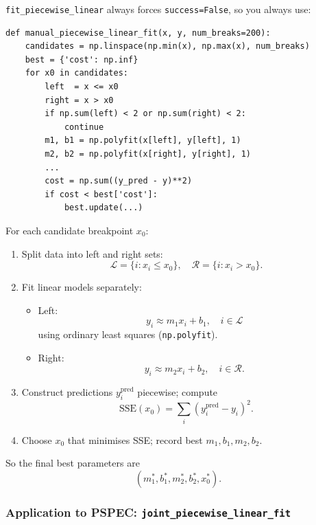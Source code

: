 \documentclass[11pt]{article}
\begin{document}
\texttt{fit\_piecewise\_linear} always forces \texttt{success=False}, so you always use:

\begin{verbatim}
def manual_piecewise_linear_fit(x, y, num_breaks=200):
    candidates = np.linspace(np.min(x), np.max(x), num_breaks)
    best = {'cost': np.inf}
    for x0 in candidates:
        left  = x <= x0
        right = x > x0
        if np.sum(left) < 2 or np.sum(right) < 2:
            continue
        m1, b1 = np.polyfit(x[left], y[left], 1)
        m2, b2 = np.polyfit(x[right], y[right], 1)
        ...
        cost = np.sum((y_pred - y)**2)
        if cost < best['cost']:
            best.update(...)
\end{verbatim}

For each candidate breakpoint $x_0$:

\begin{enumerate}[leftmargin=*]
  \item Split data into left and right sets:
  \[
    \mathcal{L} = \{i : x_i \le x_0\}, \quad
    \mathcal{R} = \{i : x_i > x_0\}.
  \]

  \item Fit linear models separately:
  \begin{itemize}[leftmargin=*]
    \item Left:
    \[
      y_i \approx m_1 x_i + b_1, \quad i \in \mathcal{L}
    \]
    using ordinary least squares (\texttt{np.polyfit}).

    \item Right:
    \[
      y_i \approx m_2 x_i + b_2, \quad i \in \mathcal{R}.
    \]
  \end{itemize}

  \item Construct predictions $y_i^{\mathrm{pred}}$ piecewise; compute
  \[
    \mathrm{SSE}(x_0) = \sum_i \left(y_i^{\mathrm{pred}} - y_i\right)^2.
  \]

  \item Choose $x_0$ that minimises SSE; record best $m_1, b_1, m_2, b_2$.
\end{enumerate}

So the final best parameters are
\[
  (m_1^\ast, b_1^\ast, m_2^\ast, b_2^\ast, x_0^\ast).
\]

\subsubsection*{Application to PSPEC: \texttt{joint\_piecewise\_linear\_fit}}
\end{document}
